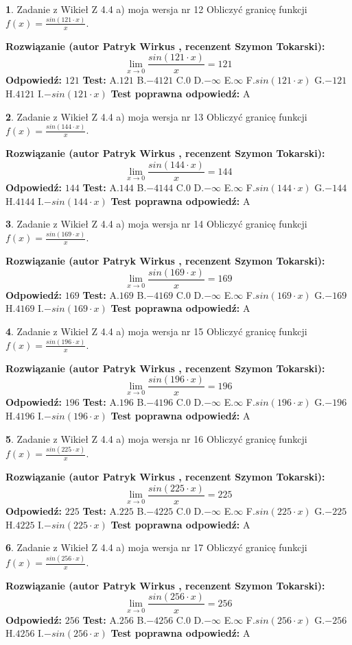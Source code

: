 \documentclass[12pt, a4paper]{article}
\theoremstyle{definition} %
\newtheorem{zad}{}
\newcommand{\zadStart}[1]{\begin{zad}#1\newline}
\newcommand{\zadStop}{\end{zad}}
\newcommand{\rozwStart}[2]{\noindent \textbf{Rozwiązanie (autor #1 , recenzent #2): }\newline}
\newcommand{\rozwStop}{\newline}
\newcommand{\odpStart}{\noindent \textbf{Odpowiedź:}\newline}
\newcommand{\odpStop}{\newline}
\newcommand{\testStart}{\noindent \textbf{Test:}\newline}
\newcommand{\testStop}{\newline}
\newcommand{\kluczStart}{\noindent \textbf{Test poprawna odpowiedź:}\newline}
\newcommand{\kluczStop}{\newline}
\begin{document}
\zadStart{Zadanie z Wikieł Z 4.4 a) moja wersja nr 12}
Obliczyć granicę funkcji $f(x)=\frac{sin(121\cdot x)}{x}$.
\zadStop
\rozwStart{Patryk Wirkus}{Szymon Tokarski}
$$\lim\limits_{x\to 0}\frac{sin(121\cdot x)}{x}=
121$$
\rozwStop
\odpStart
$121$
\odpStop
\testStart
A.$121$
B.$-4121$
C.$0$
D.$-\infty$
E.$\infty$
F.$sin(121\cdot x)$
G.$-121$
H.$4121$
I.$-sin(121\cdot x)$
\testStop
\kluczStart
A
\kluczStop



\zadStart{Zadanie z Wikieł Z 4.4 a) moja wersja nr 13}
Obliczyć granicę funkcji $f(x)=\frac{sin(144\cdot x)}{x}$.
\zadStop
\rozwStart{Patryk Wirkus}{Szymon Tokarski}
$$\lim\limits_{x\to 0}\frac{sin(144\cdot x)}{x}=
144$$
\rozwStop
\odpStart
$144$
\odpStop
\testStart
A.$144$
B.$-4144$
C.$0$
D.$-\infty$
E.$\infty$
F.$sin(144\cdot x)$
G.$-144$
H.$4144$
I.$-sin(144\cdot x)$
\testStop
\kluczStart
A
\kluczStop



\zadStart{Zadanie z Wikieł Z 4.4 a) moja wersja nr 14}
Obliczyć granicę funkcji $f(x)=\frac{sin(169\cdot x)}{x}$.
\zadStop
\rozwStart{Patryk Wirkus}{Szymon Tokarski}
$$\lim\limits_{x\to 0}\frac{sin(169\cdot x)}{x}=
169$$
\rozwStop
\odpStart
$169$
\odpStop
\testStart
A.$169$
B.$-4169$
C.$0$
D.$-\infty$
E.$\infty$
F.$sin(169\cdot x)$
G.$-169$
H.$4169$
I.$-sin(169\cdot x)$
\testStop
\kluczStart
A
\kluczStop



\zadStart{Zadanie z Wikieł Z 4.4 a) moja wersja nr 15}
Obliczyć granicę funkcji $f(x)=\frac{sin(196\cdot x)}{x}$.
\zadStop
\rozwStart{Patryk Wirkus}{Szymon Tokarski}
$$\lim\limits_{x\to 0}\frac{sin(196\cdot x)}{x}=
196$$
\rozwStop
\odpStart
$196$
\odpStop
\testStart
A.$196$
B.$-4196$
C.$0$
D.$-\infty$
E.$\infty$
F.$sin(196\cdot x)$
G.$-196$
H.$4196$
I.$-sin(196\cdot x)$
\testStop
\kluczStart
A
\kluczStop



\zadStart{Zadanie z Wikieł Z 4.4 a) moja wersja nr 16}
Obliczyć granicę funkcji $f(x)=\frac{sin(225\cdot x)}{x}$.
\zadStop
\rozwStart{Patryk Wirkus}{Szymon Tokarski}
$$\lim\limits_{x\to 0}\frac{sin(225\cdot x)}{x}=
225$$
\rozwStop
\odpStart
$225$
\odpStop
\testStart
A.$225$
B.$-4225$
C.$0$
D.$-\infty$
E.$\infty$
F.$sin(225\cdot x)$
G.$-225$
H.$4225$
I.$-sin(225\cdot x)$
\testStop
\kluczStart
A
\kluczStop



\zadStart{Zadanie z Wikieł Z 4.4 a) moja wersja nr 17}
Obliczyć granicę funkcji $f(x)=\frac{sin(256\cdot x)}{x}$.
\zadStop
\rozwStart{Patryk Wirkus}{Szymon Tokarski}
$$\lim\limits_{x\to 0}\frac{sin(256\cdot x)}{x}=
256$$
\rozwStop
\odpStart
$256$
\odpStop
\testStart
A.$256$
B.$-4256$
C.$0$
D.$-\infty$
E.$\infty$
F.$sin(256\cdot x)$
G.$-256$
H.$4256$
I.$-sin(256\cdot x)$
\testStop
\kluczStart
A
\kluczStop
\end{document}
